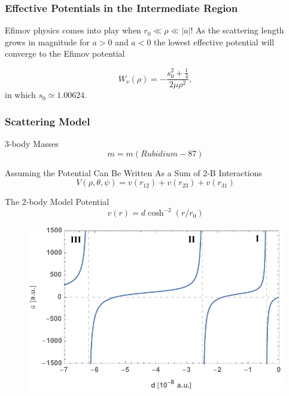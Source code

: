 \documentclass{beamer}
\begin{document}
\begin{frame}
\frametitle{Effective Potentials in the Intermediate Region}
Efimov physics comes into play when $r_0 \ll \rho \ll |a|$! As the scattering length grows in magnitude for $a>0$ and $a<0$ the lowest effective potential will converge to the Efimov potential 

\begin{equation}\label{eq:efimov_channel}
W_{\nu}(\rho) = -\frac{s_0^2+\frac{1}{4}}{2\mu \rho^2},
\end{equation} 
in which $s_0 \simeq 1.00624$.
\end{frame}

\begin{frame}
\frametitle{Scattering Model}
\begin{block}{3-body Masses}
	\begin{equation}
	m = m(Rubidium-87)
	\end{equation}
\end{block}

\begin{block}{Assuming the Potential Can Be Written As a Sum of 2-B Interactions}
 \begin{equation}
V(\rho,\theta,\psi) = v(r_{12}) + v(r_{23}) + v(r_{31})
\end{equation} 
\end{block}

\begin{block}{The 2-body Model Potential}
	\begin{equation}
	v(r) = d\cosh^{-2}{(r/r_0)}
	\end{equation}
\end{block}
\end{frame}

\begin{frame}
\begin{figure}
	\includegraphics[width=0.7\linewidth]{scatteringlength.pdf}
\end{figure}
\end{frame}
\end{document}
